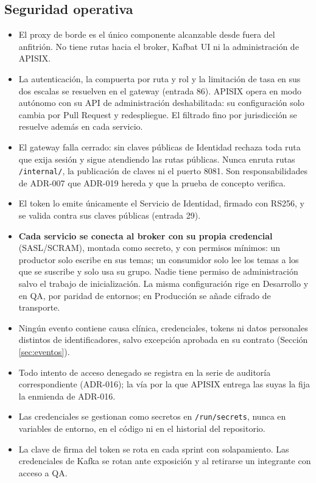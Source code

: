 \documentclass[11pt,a4paper]{article}
\begin{document}
\subsection{Seguridad operativa}
\label{sec:seguridad}

\begin{itemize}
\item El proxy de borde es el único componente alcanzable desde fuera del anfitrión. No tiene rutas hacia el broker, Kafbat UI ni la administración de APISIX.
\item La autenticación, la compuerta por ruta y rol y la limitación de tasa en sus dos escalas se resuelven en el gateway (entrada 86). APISIX opera en modo autónomo con su API de administración deshabilitada: su configuración solo cambia por Pull Request y redespliegue. El filtrado fino por jurisdicción se resuelve además en cada servicio.
\item El gateway falla cerrado: sin claves públicas de Identidad rechaza toda ruta que exija sesión y sigue atendiendo las rutas públicas. Nunca enruta rutas \texttt{/internal/}, la publicación de claves ni el puerto 8081. Son responsabilidades de ADR-007 que ADR-019 hereda y que la prueba de concepto verifica.
\item El token lo emite únicamente el Servicio de Identidad, firmado con RS256, y se valida contra sus claves públicas (entrada 29).
\item \textbf{Cada servicio se conecta al broker con su propia credencial} (SASL/SCRAM), montada como secreto, y con permisos mínimos: un productor solo escribe en sus temas; un consumidor solo lee los temas a los que se suscribe y solo usa su grupo. Nadie tiene permiso de administración salvo el trabajo de inicialización. La misma configuración rige en Desarrollo y en QA, por paridad de entornos; en Producción se añade cifrado de transporte.
\item Ningún evento contiene causa clínica, credenciales, tokens ni datos personales distintos de identificadores, salvo excepción aprobada en su contrato (Sección \ref{sec:eventos}).
\item Todo intento de acceso denegado se registra en la serie de auditoría correspondiente (ADR-016); la vía por la que APISIX entrega las suyas la fija la enmienda de ADR-016.
\item Las credenciales se gestionan como secretos en \texttt{/run/secrets}, nunca en variables de entorno, en el código ni en el historial del repositorio.
\item La clave de firma del token se rota en cada sprint con solapamiento. Las credenciales de Kafka se rotan ante exposición y al retirarse un integrante con acceso a QA.

\end{itemize}
\end{document}
